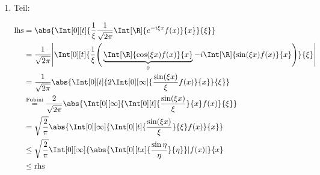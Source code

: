 \begin{solution}

\phantom{}

\begin{enumerate}[label = \arabic*.]

    \item Teil:

    \begin{align*}
        \mathrm{lhs}
        & =
        \abs
        {
            \Int[0][t]
            {
                \frac{1}{\xi}
                \frac{1}{\sqrt{2 \pi}}
                \Int[\R]
                {
                    e^{-i \xi x}
                    f(x)
                }{x}
            }{\xi}
        } \\
        & =
        \frac{1}{\sqrt{2 \pi}}
        \Bigg |
            \Int[0][t]
            {
                \frac{1}{\xi}
                \Bigg (
                    \underbrace
                    {
                        \Int[\R]
                        {
                            \cos(\xi x)
                            f(x)
                        }{x}    
                    }_0
                    -
                    i
                    \Int[\R]
                    {
                        \sin(\xi x)
                        f(x)
                    }{x}
                \Bigg )
            }{\xi}
        \Bigg | \\
        & =
        \frac{1}{\sqrt{2 \pi}}
        \abs
        {
            \Int[0][t]
            {
                2
                \Int[0][\infty]
                {
                    \frac{\sin(\xi x)}{\xi}
                    f(x)
                }{x}
            }{\xi}
        } \\
        & \stackrel
        {
            \text{Fubini}
        }{=}
        \frac{2}{\sqrt{2 \pi}}
        \abs
        {
            \Int[0][\infty]
            {
                \Int[0][t]
                {
                    \frac{\sin(\xi x)}{\xi}
                }{x}
                f(x)
            }{\xi}
        } \\
        & =
        \sqrt \frac{2}{\pi}
        \abs
        {
            \Int[0][\infty]
            {
                \Int[0][t]
                {
                    \frac{\sin(\xi x)}{\xi}
                }{\xi}
                f(x)
            }{x}    
        } \\
        & \leq
        \sqrt \frac{2}{\pi}
        \Int[0][\infty]
        {
            \abs
            {
                \Int[0][t x]
                {
                    \frac{\sin \eta}{\eta}
                }{\eta}
            }
            |f(x)|
        }{x} \\
        & \leq
        \mathrm{rhs}
    \end{align*}


\end{enumerate}
\end{solution}
